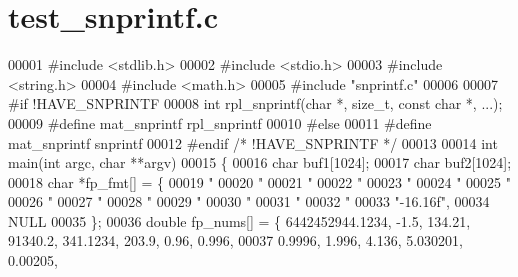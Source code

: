 \hypertarget{test__snprintf_8c_source}{}\section{test\+\_\+snprintf.\+c}
\label{test__snprintf_8c_source}

\begin{DoxyCode}
00001 \textcolor{preprocessor}{#include <stdlib.h>}
00002 \textcolor{preprocessor}{#include <stdio.h>}
00003 \textcolor{preprocessor}{#include <string.h>}
00004 \textcolor{preprocessor}{#include <math.h>}
00005 \textcolor{preprocessor}{#include "snprintf.c"}
00006 
00007 \textcolor{preprocessor}{#if !HAVE\_SNPRINTF}
00008 \textcolor{keywordtype}{int} rpl\_snprintf(\textcolor{keywordtype}{char} *, \textcolor{keywordtype}{size\_t}, \textcolor{keyword}{const} \textcolor{keywordtype}{char} *, ...);
00009 \textcolor{preprocessor}{#define mat\_snprintf rpl\_snprintf}
00010 \textcolor{preprocessor}{#else}
00011 \textcolor{preprocessor}{#define mat\_snprintf snprintf}
00012 \textcolor{preprocessor}{#endif  }\textcolor{comment}{/* !HAVE\_SNPRINTF */}\textcolor{preprocessor}{}
00013 
00014 \textcolor{keywordtype}{int} main(\textcolor{keywordtype}{int} argc, \textcolor{keywordtype}{char} **argv)
00015 \{
00016         \textcolor{keywordtype}{char} buf1[1024];
00017         \textcolor{keywordtype}{char} buf2[1024];
00018         \textcolor{keywordtype}{char} *fp\_fmt[] = \{
00019                 \textcolor{stringliteral}{"%
00020                 \textcolor{stringliteral}{"%
00021                 \textcolor{stringliteral}{"%
00022                 \textcolor{stringliteral}{"%
00023                 \textcolor{stringliteral}{"%
00024                 \textcolor{stringliteral}{"%
00025                 \textcolor{stringliteral}{"%
00026                 \textcolor{stringliteral}{"%
00027                 \textcolor{stringliteral}{"%
00028                 \textcolor{stringliteral}{"%
00029                 \textcolor{stringliteral}{"%
00030                 \textcolor{stringliteral}{"%
00031                 \textcolor{stringliteral}{"%
00032                 \textcolor{stringliteral}{"%
00033                 \textcolor{stringliteral}{"-16.16f"},
00034                 NULL
00035         \};
00036         \textcolor{keywordtype}{double} fp\_nums[] = \{ 6442452944.1234, -1.5, 134.21, 91340.2, 341.1234, 203.9, 0.96, 0.996,
00037                              0.9996, 1.996, 4.136, 5.030201, 0.00205,
}}}}}}}}}}}}}}
\end{DoxyCode}
